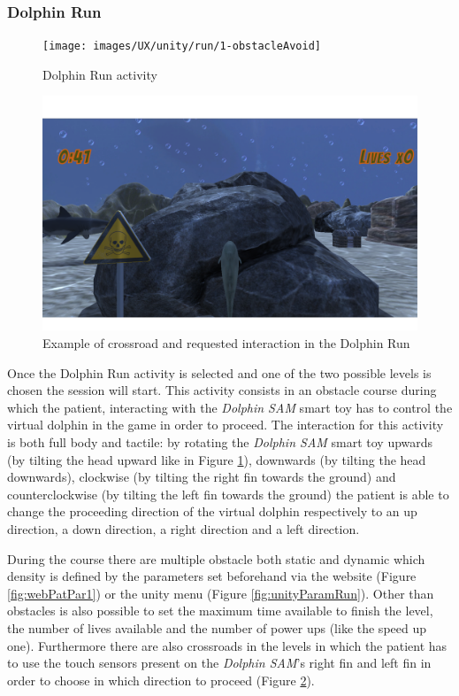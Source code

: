 \subsubsection{Dolphin Run}
\begin{figure}[h!]
	\texttt{[image: images/UX/unity/run/1-obstacleAvoid]}
	\caption{Dolphin Run activity}
	\label{fig:unityObstAvoid}
\end{figure}
\begin{figure}[h!]
	\includegraphics[width=\textwidth]{images/UX/unity/run/2-crossroad}
	\caption{Example of crossroad and requested interaction in the Dolphin Run}
	\label{fig:unityDolphRunCross}
\end{figure}
\pagebreak
Once the Dolphin Run activity is selected and one of the two possible levels is chosen the session will start.
This activity consists in an obstacle course during which the patient, interacting with the \textit{Dolphin SAM} smart toy has to control the virtual dolphin in the game in order to proceed.
The interaction for this activity is both full body and tactile: by rotating the \textit{Dolphin SAM} smart toy upwards (by tilting the head upward like in Figure \ref{fig:unityObstAvoid}), downwards (by tilting the head downwards), clockwise (by tilting the right fin towards the ground) and counterclockwise (by tilting the left fin towards the ground) the patient is able to change the proceeding direction of the virtual dolphin respectively to an up direction, a down direction, a right direction and a left direction.

During the course there are multiple obstacle both static and dynamic which density is defined by the parameters set beforehand via the website (Figure \ref{fig:webPatPar1}) or the unity menu (Figure \ref{fig:unityParamRun}). Other than obstacles is also possible to set the maximum time available to finish the level, the number of lives available and the number of power ups (like the speed up one).
 Furthermore there are also crossroads in the levels in which the patient has to use the touch sensors present on the \textit{Dolphin SAM}'s right fin and left fin in order to choose in which direction to proceed (Figure \ref{fig:unityDolphRunCross}).

